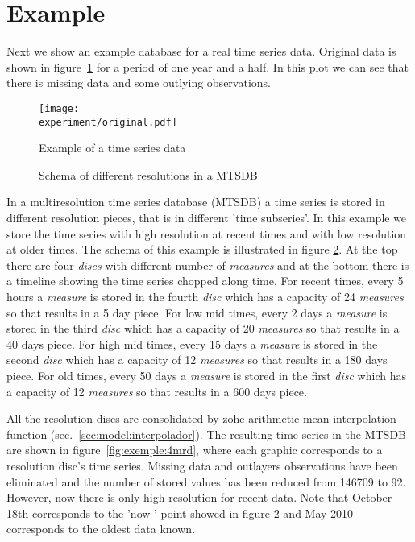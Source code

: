 \section{Example}

Next we show an example database for a real time series data. Original
data is shown in figure~\ref{fig:exemple:original} for a period of one
year and a half. In this plot we can see that there is missing
data and some outlying observations.


\begin{figure}[tp]
\centering
\texttt{[image: \\experiment/original.pdf]}
\caption{Example of a time series data}
\label{fig:exemple:original}
\end{figure}



\begin{figure}[tp]
\centering

\caption{Schema of different resolutions in a MTSDB}
\label{fig:exemple:window}
\end{figure}


In a multiresolution time series database (MTSDB) a time series is
stored in different resolution pieces, that is in different 'time
subseries'.  In this example we store the time series with high
resolution at recent times and with low resolution at older times. The
schema of this example is illustrated in figure
\ref{fig:exemple:window}. At the top there are four \emph{discs} with
different number of \emph{measures} and at the bottom there is a
timeline showing the time series chopped along time. For recent times,
every 5 hours a \emph{measure} is stored in the fourth \emph{disc}
which has a capacity of 24 \emph{measures} so that results in a 5 day
piece. For low mid times, every 2 days a \emph{measure} is stored in
the third \emph{disc} which has a capacity of 20 \emph{measures} so
that results in a 40 days piece. For high mid times, every 15 days a
\emph{measure} is stored in the second \emph{disc} which has a
capacity of 12 \emph{measures} so that results in a 180 days
piece. For old times, every 50 days a \emph{measure} is stored in the
first \emph{disc} which has a capacity of 12 \emph{measures} so that
results in a 600 days piece.

All the resolution discs are consolidated by zohe arithmetic mean
interpolation function (sec.~\ref{sec:model:interpolador}). The resulting time series
in the MTSDB are shown in figure~\ref{fig:exemple:4mrd}, where each
graphic corresponds to a resolution disc's time series. Missing data
and outlayers observations have been eliminated and the number of
stored values has been reduced from 146709 to 92. However, now there
is only high resolution for recent data. Note that October 18th
corresponds to the 'now ' point showed in figure
\ref{fig:exemple:window} and May 2010 corresponds to the oldest data
known.

